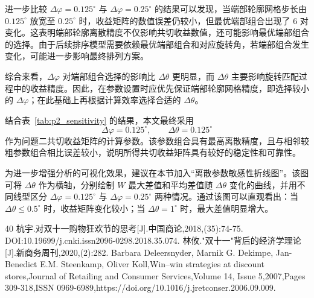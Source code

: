 \documentclass[UTF8]{ctexart}
\begin{document}
进一步比较 $\Delta\varphi=0.125^\circ$ 与 $\Delta\varphi=0.25^\circ$ 的结果可以发现，当端部轮廓网格步长由 $0.125^\circ$ 放宽至 $0.25^\circ$ 时，收益矩阵的数值误差仍较小，但最优端部组合出现了 $6$ 对变化。这表明端部轮廓离散精度不仅影响共切收益数值，还可能影响最优端部组合的选择。由于后续排序模型需要依赖最优端部组合和对应旋转角，若端部组合发生变化，可能进一步影响最终排列方案。

综合来看，$\Delta\varphi$ 对端部组合选择的影响比 $\Delta\theta$ 更明显，而 $\Delta\theta$ 主要影响旋转匹配过程中的收益精度。因此，在参数设置时应优先保证端部轮廓网格精度，即选择较小的 $\Delta\varphi$；在此基础上再根据计算效率选择合适的 $\Delta\theta$。

结合表~\ref{tab:p2_sensitivity} 的结果，本文最终采用
\[
\Delta\varphi=0.125^\circ,\qquad \Delta\theta=0.125^\circ
\]
作为问题二共切收益矩阵的计算参数。该参数组合具有最高离散精度，且与相邻较粗参数组合相比误差较小，说明所得共切收益矩阵具有较好的稳定性和可靠性。

为进一步增强分析的可视化效果，建议在本节加入“离散参数敏感性折线图”。该图可将 $\Delta\theta$ 作为横轴，分别绘制 $W$ 最大差值和平均差值随 $\Delta\theta$ 变化的曲线，并用不同线型区分 $\Delta\varphi=0.125^\circ$ 与 $\Delta\varphi=0.25^\circ$ 两种情况。通过该图可以直观看出：当 $\Delta\theta\leq0.5^\circ$ 时，收益矩阵变化较小；当 $\Delta\theta=1^\circ$ 时，最大差值明显增大。








\begin{thebibliography}{40}
	杭宇.对双十一购物狂欢节的思考[J].中国商论,2018,(35):74-75. DOI:10.19699/j.cnki.issn2096-0298.2018.35.074.
	林攸."双十一"背后的经济学理论[J].新商务周刊,2020,(2):282.
	Barbara Deleersnyder, Marnik G. Dekimpe, Jan-Benedict E.M. Steenkamp, Oliver Koll,Win–win strategies at discount stores,Journal of Retailing and Consumer Services,Volume 14, Issue 5,2007,Pages 309-318,ISSN 0969-6989,https://doi.org/10.1016/j.jretconser.2006.09.009.

	
	
	
\end{thebibliography}
\newpage
{}	%
\end{document}
